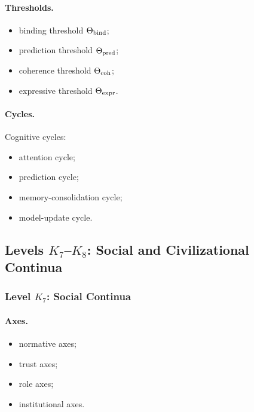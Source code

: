 \paragraph{Thresholds.}
\begin{itemize}
    \item binding threshold \(\Theta_{\rm bind}\);
    \item prediction threshold \(\Theta_{\rm pred}\);
    \item coherence threshold \(\Theta_{\rm coh}\);
    \item expressive threshold \(\Theta_{\rm expr}\).
\end{itemize}

\paragraph{Cycles.}
Cognitive cycles:
\begin{itemize}
    \item attention cycle;
    \item prediction cycle;
    \item memory-consolidation cycle;
    \item model-update cycle.
\end{itemize}


\subsection{Levels \texorpdfstring{\texorpdfstring{$K_7$}{K\_7}–\texorpdfstring{$K_8$}{K\_8}}{K7–K8}: Social and Civilizational Continua}

\subsubsection{Level \texorpdfstring{\(K_7\)}{K7}: Social Continua}

\paragraph{Axes.}
\begin{itemize}
    \item normative axes;
    \item trust axes;
    \item role axes;
    \item institutional axes.
\end{itemize}

